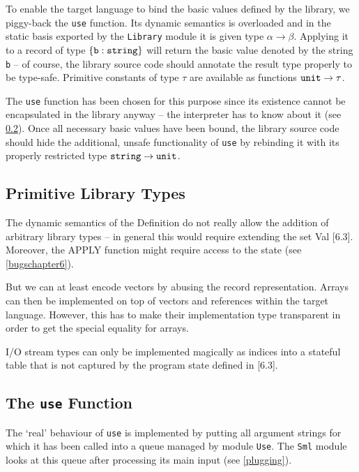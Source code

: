 \documentclass[twoside,titlepage]{article}
\newcommand{\void}[1]{}
\begin{document}
To enable the target language to bind the basic values defined by the library, we piggy-back the {\tt use} function. Its dynamic semantics is overloaded and in the static basis exported by the {\tt Library} module it is given type {\tt $\alpha\to\beta$}. Applying it to a record of type $\{{\tt{b}}:{\tt{string}}\}$ will return the basic value denoted by the string {\tt b} -- of course, the library source code should annotate the result type properly to be type-safe. Primitive constants of type $\tau$ are available as functions ${\tt unit}\to\tau$.

The {\tt use} function has been chosen for this purpose since its existence cannot be encapsulated in the library anyway -- the interpreter has to know about it (see \ref{use}). Once all necessary basic values have been bound, the library source code should hide the additional, unsafe functionality of {\tt use} by rebinding it with its properly restricted type ${\tt string}\to{\tt unit}$.


\subsection{Primitive Library Types}
\label{primtypes}

The dynamic semantics of the Definition do not really allow the addition of arbitrary library types -- in general this would require extending the set Val [6.3]. Moreover, the APPLY function might require access to the state (see \ref{bugschapter6}).

But we can at least encode vectors by abusing the record representation. Arrays can then be implemented on top of vectors and references within the target language. However, this has to make their implementation type transparent in order to get the special equality for arrays.\void{\footnote{Although HaMLet already generalises the special equality characteristics of references (see \ref{tynames}) we do not currently use that for arrays because it would require making them primitive.}}

I/O stream types can only be implemented magically as indices into a stateful table that is not captured by the program state defined in [6.3].


\subsection{The {\tt use} Function}
\label{use}

The `real' behaviour of {\tt use} is implemented by putting all argument strings for which it has been called into a queue managed by module {\tt Use}. The {\tt Sml} module looks at this queue after processing its main input (see \ref{plugging}).
\end{document}
